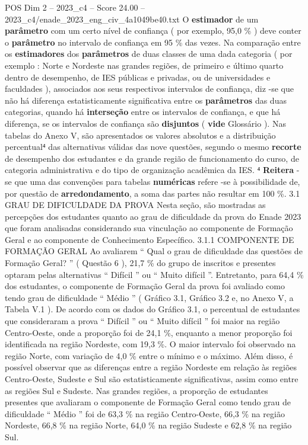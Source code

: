 \begin{textsample}{POS Dim 2 – 2023\_c4 – Score 24.00 – 2023\_c4/enade\_2023\_eng\_civ\_4a1049be40.txt}
O \textbf{estimador} de um \textbf{parâmetro} com um certo nível de confiança ( por exemplo, 95,0 \% ) deve conter o \textbf{parâmetro} no intervalo de confiança em 95 \% das vezes.
Na comparação entre os \textbf{estimadores} dos \textbf{parâmetros} de duas classes de uma dada categoria ( por exemplo : Norte e Nordeste nas grandes regiões, de primeiro e último quarto dentro de desempenho, de IES públicas e privadas, ou de universidades e faculdades ), associados aos seus respectivos intervalos de confiança, diz -se que não há diferença estatisticamente significativa entre os \textbf{parâmetros} das duas categorias, quando há \textbf{interseção} entre os intervalos de confiança, e que há diferença, se os intervalos de confiança são \textbf{disjuntos} ( \textbf{vide} Glossário ).
Nas tabelas do Anexo V, são apresentados os valores absolutos e a distribuição percentual⁴ das alternativas válidas das nove questões, segundo o mesmo \textbf{recorte} de desempenho dos estudantes e da grande região de funcionamento do curso, de categoria administrativa e do tipo de organização acadêmica da IES. ⁴ \textbf{Reitera} -se que uma das convenções para tabelas \textbf{numéricas} refere -se à possibilidade de, por questão de \textbf{arredondamento}, a soma das partes não resultar em 100 \%. 3.1 GRAU DE DIFICULDADE DA PROVA Nesta seção, são mostradas as percepções dos estudantes quanto ao grau de dificuldade da prova do Enade 2023 que foram analisadas considerando sua vinculação ao componente de Formação Geral e ao componente de Conhecimento Específico. 3.1.1 COMPONENTE DE FORMAÇÃO GERAL Ao avaliarem “ Qual o grau de dificuldade das questões de Formação Geral? ” ( Questão 6 ), 21,7 \% do grupo de inscritos e presentes optaram pelas alternativas “ Difícil ” ou “ Muito difícil ”.
Entretanto, para 64,4 \% dos estudantes, o componente de Formação Geral da prova foi avaliado como tendo grau de dificuldade “ Médio ” ( Gráfico 3.1, Gráfico 3.2 e, no Anexo V, a Tabela V.1 ).
De acordo com os dados do Gráfico 3.1, o percentual de estudantes que consideraram a prova “ Difícil ” ou “ Muito difícil ” foi maior na região Centro-Oeste, onde a proporção foi de 24,1 \%, enquanto a menor proporção foi identificada na região Nordeste, com 19,3 \%.
O maior intervalo foi observado na região Norte, com variação de 4,0 \% entre o mínimo e o máximo.
Além disso, é possível observar que as diferenças entre a região Nordeste em relação às regiões Centro-Oeste, Sudeste e Sul são estatisticamente significativas, assim como entre as regiões Sul e Sudeste.
Nas grandes regiões, a proporção de estudantes presentes que avaliaram o componente de Formação Geral como tendo grau de dificuldade “ Médio ” foi de 63,3 \% na região Centro-Oeste, 66,3 \% na região Nordeste, 66,8 \% na região Norte, 64,0 \% na região Sudeste e 62,8 \% na região Sul.

\end{textsample}
